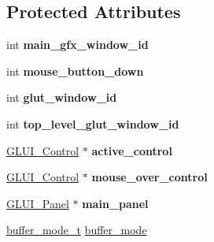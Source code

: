 \subsection*{Protected Attributes}
\begin{DoxyCompactItemize}
\item 
\hypertarget{class_g_l_u_i___main_a43cd4a18026504db98178d766d18a78c}{int {\bfseries main\+\_\+gfx\+\_\+window\+\_\+id}}\label{class_g_l_u_i___main_a43cd4a18026504db98178d766d18a78c}

\item 
\hypertarget{class_g_l_u_i___main_a5002dc3587df870eb12a62be1568861b}{int {\bfseries mouse\+\_\+button\+\_\+down}}\label{class_g_l_u_i___main_a5002dc3587df870eb12a62be1568861b}

\item 
\hypertarget{class_g_l_u_i___main_a4c2cd2330267eca938028a8a6fcb6382}{int {\bfseries glut\+\_\+window\+\_\+id}}\label{class_g_l_u_i___main_a4c2cd2330267eca938028a8a6fcb6382}

\item 
\hypertarget{class_g_l_u_i___main_afec9a40c9b4c139934236d094fcf81f6}{int {\bfseries top\+\_\+level\+\_\+glut\+\_\+window\+\_\+id}}\label{class_g_l_u_i___main_afec9a40c9b4c139934236d094fcf81f6}

\item 
\hypertarget{class_g_l_u_i___main_a552e13b05f63046ebe3f1911e27e3d58}{\hyperlink{class_g_l_u_i___control}{G\+L\+U\+I\+\_\+\+Control} $\ast$ {\bfseries active\+\_\+control}}\label{class_g_l_u_i___main_a552e13b05f63046ebe3f1911e27e3d58}

\item 
\hypertarget{class_g_l_u_i___main_a74c11c17faf8a0c957d5654c420dc97f}{\hyperlink{class_g_l_u_i___control}{G\+L\+U\+I\+\_\+\+Control} $\ast$ {\bfseries mouse\+\_\+over\+\_\+control}}\label{class_g_l_u_i___main_a74c11c17faf8a0c957d5654c420dc97f}

\item 
\hypertarget{class_g_l_u_i___main_a727ecf1f0315ff01503415dc420b47a2}{\hyperlink{class_g_l_u_i___panel}{G\+L\+U\+I\+\_\+\+Panel} $\ast$ {\bfseries main\+\_\+panel}}\label{class_g_l_u_i___main_a727ecf1f0315ff01503415dc420b47a2}

\item 
\hypertarget{class_g_l_u_i___main_a4ba466d21144d6fd0c7984039523ad2f}{\hyperlink{class_g_l_u_i___main_a0024f5e2750f6fe9e428ff885cf6d62e}{buffer\+\_\+mode\+\_\+t} \hyperlink{class_g_l_u_i___main_a4ba466d21144d6fd0c7984039523ad2f}{buffer\+\_\+mode}}\label{class_g_l_u_i___main_a4ba466d21144d6fd0c7984039523ad2f}


\end{DoxyCompactItemize}
